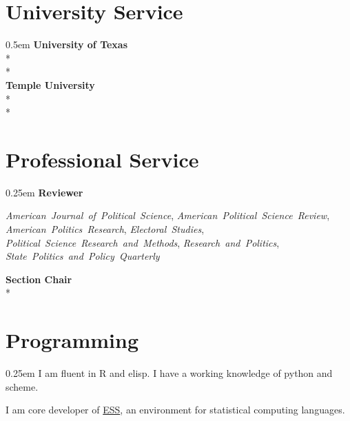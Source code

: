 \documentclass[article,11pt,oneside,letterpaper]{memoir}
\begin{document}
\section{University Service}{0.5em}
\textbf{University of Texas} \\*
 \\*
\\
\textbf{Temple University}\\*
 \\*
\\
\vspace{-1em}

\section{Professional Service}{0.25em}
\textbf{Reviewer}
\begin{adjustwidth}{\widthof{\hphantom{xyz}}}{}
  \begin{flushleft}
    \emph{American~Journal~of~Political~Science},
    \emph{American~Political~Science~Review},
    \emph{American~Politics~Research},
    \emph{Electoral~Studies},
    \emph{Political~Science~Research~and~Methods},
    \emph{Research~and~Politics},
    \emph{State~Politics~and~Policy~Quarterly}
  \end{flushleft}
\end{adjustwidth}

\textbf{Section Chair}\\*

\section{Programming}{0.25em}
I am fluent in R and elisp. I have a working knowledge of python and scheme.

I am core developer of \href{https://ess.r-project.org}{ESS}, an environment for statistical computing languages.

\thispagestyle{lastpage}
\end{document}
